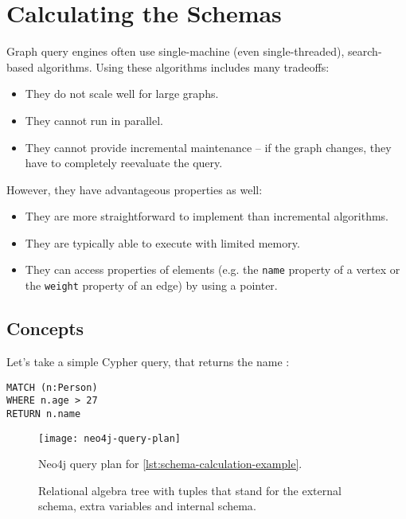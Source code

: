 \chapter{Calculating the Schemas}

Graph query engines often use single-machine (even single-threaded), search-based algorithms. Using these algorithms includes many tradeoffs:

\begin{itemize}
	\item They do not scale well for large graphs.
	\item They cannot run in parallel.
	\item They cannot provide incremental maintenance -- if the graph changes, they have to completely reevaluate the query.
\end{itemize}

However, they have advantageous properties as well:

\begin{itemize}
	\item They are more straightforward to implement than incremental algorithms.
	\item They are typically able to execute with limited memory.
	\item They can access properties of elements (e.g. the \texttt{name} property of a vertex or the \texttt{weight} property of an edge) by using a pointer.
\end{itemize}

\section{Concepts}

Let's take a simple Cypher query, that returns the name :

\begin{lstlisting}[label=lst:schema-calculation-example, caption=Example query]
MATCH (n:Person)
WHERE n.age > 27
RETURN n.name
\end{lstlisting}

\newcommand{\screenshotscale}{0.45}

\begin{figure}
	\centering
	\texttt{[image: neo4j-query-plan]}
	\caption{Neo4j query plan for \autoref{lst:schema-calculation-example}.}
	\label{fig:neo4-query-plan}
\end{figure}

\begin{figure}
	\centering
	
	\caption{Relational algebra tree with tuples that stand for the \textcolor{externalschemacolor}{external schema}, \textcolor{extravariablescolor}{extra variables} and \textcolor{internalschemacolor}{internal schema}.}
	\label{fig:example-schema-calculation}
\end{figure}

